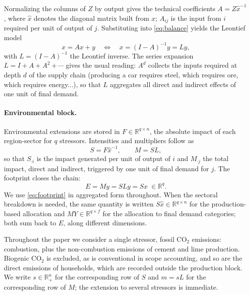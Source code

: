 \documentclass[11pt,a4paper]{article}
\begin{document}
Normalizing the columns of $Z$ by output gives the technical coefficients $A = Z \hat{x}^{-1}$, where $\hat{x}$ denotes the diagonal matrix built from $x$; $A_{ij}$ is the input from $i$ required per unit of output of $j$. Substituting into
\eqref{eq:balance} yields the Leontief model
\begin{equation}\label{eq:leontief}
  x = A x + y
  \quad \Longleftrightarrow \quad
  x = (I - A)^{-1} y = L y ,
\end{equation}
with $L = (I-A)^{-1}$ the Leontief inverse. The series expansion
$L = I + A + A^2 + \cdots$ gives the usual reading: $A^d$ collects the inputs required at depth $d$ of the supply chain (producing a car requires steel, which requires ore, which requires energy...), so that $L$ aggregates all direct and indirect effects of one
unit of final demand.

\paragraph{Environmental block.}
Environmental extensions are stored in $F \in \mathbb{R}^{q \times n}$, the absolute impact of each region-sector for $q$ stressors. Intensities and multipliers follow as
\begin{equation}\label{eq:env}
  S = F \hat{x}^{-1},
  \qquad
  M = S L ,
\end{equation}
so that $S_{\cdot i}$ is the impact generated per unit of output of $i$ and $M_{\cdot j}$ the total impact, direct and indirect, triggered by one unit of final demand for $j$. The
footprint closes the chain:
\begin{equation}\label{eq:footprint}
  E = M y = S L y = S x \; \in \mathbb{R}^q .
\end{equation}
We use \eqref{eq:footprint} in aggregated form throughout. When the sectoral breakdown is needed, the same quantity is written $S \hat{x} \in \mathbb{R}^{q \times n}$ for the production-based allocation and $M Y \in \mathbb{R}^{q \times f}$ for the allocation to final demand categories; both sum back to $E$, along different dimensions.

Throughout the paper we consider a single stressor, fossil CO$_2$ emissions: combustion, plus the non-combustion emissions of cement and lime production. Biogenic CO$_2$ is excluded, as is conventional in scope accounting, and so are the direct emissions of households, which are recorded outside the production block. We write $s \in \mathbb{R}^n_+$ for the corresponding row of $S$ and $m = s L$ for the corresponding row of $M$; the extension to several stressors is immediate.
\end{document}
